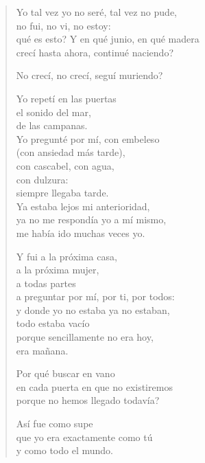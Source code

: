 \documentclass[12pt]{article}
\begin{document}
\clearpage
{}
\begin{verse}

Yo tal vez yo no seré, tal vez no pude,\\
no fui, no vi, no estoy:\\
qué es esto? Y en qué junio, en qué madera\\
crecí hasta ahora, continué naciendo?  

No crecí, no crecí, seguí muriendo?  

Yo repetí en las puertas\\
el sonido del mar,\\
de las campanas.\\
Yo pregunté por mí, con embeleso\\
(con ansiedad más tarde),\\
con cascabel, con agua,\\
con dulzura:\\
siempre llegaba tarde.\\
Ya estaba lejos mi anterioridad,\\
ya no me respondía yo a mí mismo,\\
me había ido muchas veces yo.  

Y fui a la próxima casa,\\
a la próxima mujer,\\
a todas partes\\
a preguntar por mí, por ti, por todos:\\
y donde yo no estaba ya no estaban,\\
todo estaba vacío\\
porque sencillamente no era hoy,\\
era mañana.  

Por qué buscar en vano\\
en cada puerta en que no existiremos\\
porque no hemos llegado todavía?  

Así fue como supe\\
que yo era exactamente como tú\\
y como todo el mundo.  

\end{verse}
\end{document}
